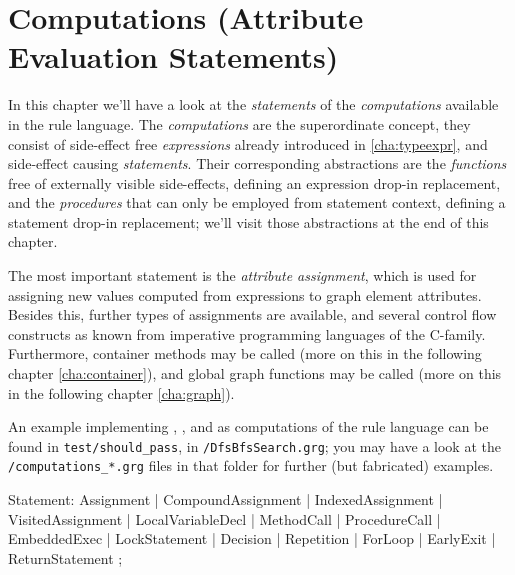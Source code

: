 \chapter{Computations (Attribute Evaluation Statements)}
\label{cha:computations}

In this chapter we'll have a look at the \emph{statements} of the \emph{computations} available in the rule language.
The \emph{computations} are the superordinate concept, they consist of side-effect free \emph{expressions} already introduced in \ref{cha:typeexpr}, and side-effect causing \emph{statements}.
Their corresponding abstractions are the \emph{functions} free of externally visible side-effects, defining an expression drop-in replacement, and the \emph{procedures} that can only be employed from statement context, defining a statement drop-in replacement; we'll visit those abstractions at the end of this chapter.

The most important statement is the \emph{attribute assignment}, which is used for assigning new values computed from expressions to graph element attributes.
Besides this, further types of assignments are available, and several control flow constructs as known from imperative programming languages of the C-family.
Furthermore, container methods may be called (more on this in the following chapter \ref{cha:container}), 
and global graph functions may be called (more on this in the following chapter \ref{cha:graph}).

An example implementing , , and  as computations of the rule language can be found in \texttt{test/should\_pass}, in \texttt{/DfsBfsSearch.grg}; you may have a look at the \verb#/computations_*.grg# files in that folder for further (but fabricated) examples.

\begin{rail}
  Statement:
      Assignment
    | CompoundAssignment
    | IndexedAssignment
    | VisitedAssignment
    | LocalVariableDecl
    | MethodCall
    | ProcedureCall
    | EmbeddedExec
    | LockStatement
    | Decision
    | Repetition
    | ForLoop
    | EarlyExit
    | ReturnStatement
    ;
\end{rail}\label{computationstatemet}



